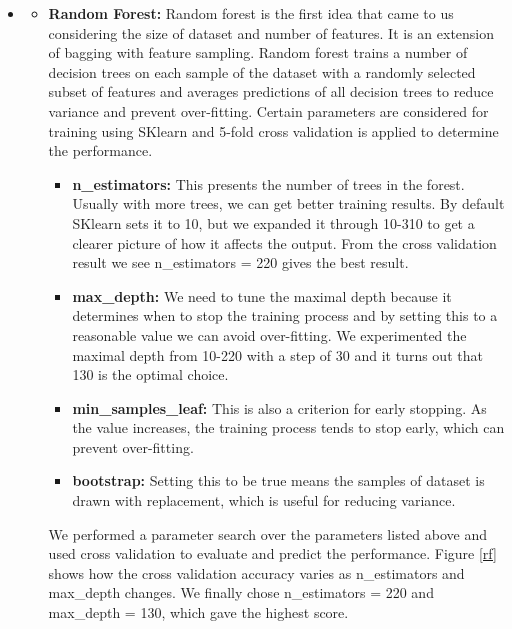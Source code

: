 \begin{itemize}
    \item {}
    \begin{itemize}
    \item \textbf{Random Forest:} Random forest is the first idea that came to us considering the size of dataset and number of features. It is an extension of bagging with feature sampling. Random forest trains a number of decision trees on each sample of the dataset with a randomly selected subset of features and averages predictions of all decision trees to reduce variance and prevent over-fitting. Certain parameters are considered for training using SKlearn and 5-fold cross validation is applied to determine the performance.
    \begin{itemize}
    \item \textbf{n_estimators:} This presents the number of trees in the forest. Usually with more trees, we can get better training results. By default SKlearn sets it to 10, but we expanded it through 10-310 to get a clearer picture of how it affects the output. From the cross validation result we see n_estimators = 220 gives the best result. 
    \item \textbf{max_depth:} We need to tune the maximal depth because it determines when to stop the training process and by setting this to a reasonable value we can avoid over-fitting. We experimented the maximal depth from 10-220 with a step of 30 and it turns out that 130 is the optimal choice.
    \item \textbf{min_samples_leaf:} This is also a criterion for early stopping. As the value increases, the training process tends to stop early, which can prevent over-fitting.
    \item \textbf{bootstrap:} Setting this to be true means the samples of dataset is drawn with replacement, which is useful for reducing variance.
    \end{itemize}
    We performed a parameter search over the parameters listed above and used cross validation to evaluate and predict the performance. Figure \ref{rf} shows how the cross validation accuracy varies as n_estimators and max_depth changes. We finally chose n_estimators = 220 and max_depth = 130, which gave the highest score.
    

\end{itemize}
\end{itemize}
